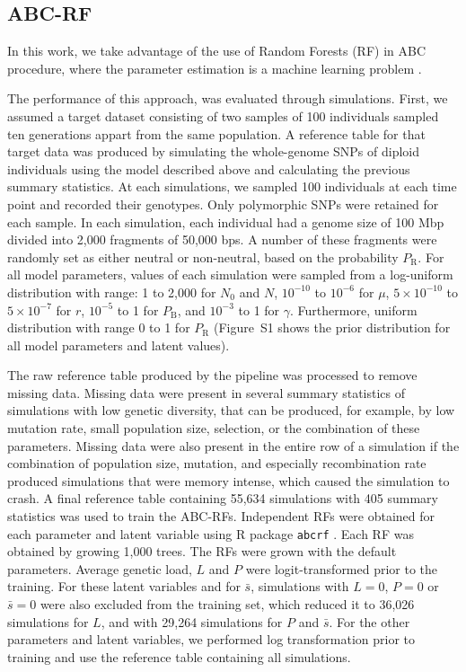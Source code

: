 \documentclass[a4paper, 12pt]{article}
\begin{document}
\subsection*{ABC-RF}

In this work, we take advantage of the use of Random Forests (RF) in ABC procedure, where the parameter estimation is a machine learning problem \citep{Pudlo:2016il, Raynal:2019jj}.

The performance of this approach, was evaluated through simulations. First, we assumed a target dataset consisting of two samples of 100 individuals sampled ten generations appart from the same population. A reference table for that target data was produced by simulating the whole-genome SNPs of diploid individuals using the model described above and calculating the previous summary statistics. At each simulations, we sampled 100 individuals at each time point and recorded their genotypes. Only polymorphic SNPs were retained for each sample. In each simulation, each individual had a genome size of 100 Mbp divided into 2,000 fragments of 50,000 bps. A number of these fragments were randomly set as either neutral or non-neutral, based on the probability $P_{\mathrm{R}}$. For all model parameters, values of each simulation were sampled from a log-uniform distribution with range: 1 to 2,000 for $N_\mathrm{0}$ and $N$, $10^{-10}$ to $10^{-6}$ for $\mu$, $5\times 10^{-10}$ to $5\times 10^{-7}$ for $r$, $10^{-5}$ to 1 for $P_{\mathrm{B}}$, and $10^{-3}$ to 1 for $\gamma$. Furthermore, uniform distribution with range 0 to 1 for $P_{\mathrm{R}}$ (Figure~S1 shows the prior distribution for all model parameters and latent values).

The raw reference table produced by the pipeline was processed to remove missing data. Missing data were present in several summary statistics of simulations with low genetic diversity, that can be produced, for example, by low mutation rate, small population size, selection, or the combination of these parameters. Missing data were also present in the entire row of a simulation if the combination of population size, mutation, and especially recombination rate produced simulations that were memory intense, which caused the simulation to crash. A final reference table containing 55,634 simulations with 405 summary statistics was used to train the ABC-RFs. Independent RFs were obtained for each parameter and latent variable using R package \texttt{abcrf} \citep{Pudlo:2016il, Raynal:2019jj}. Each RF was obtained by growing 1,000 trees. The RFs were grown with the default parameters. Average genetic load, $L$ and $P$ were logit-transformed prior to the training. For these latent variables and for $\bar{s}$, simulations with $L=0$, $P=0$ or $\bar{s} = 0$ were also excluded from the training set, which reduced it to 36,026 simulations for $L$, and with 29,264 simulations for $P$ and $\bar{s}$. For the other parameters and latent variables, we performed log transformation prior to training and use the reference table containing all simulations.
\end{document}
